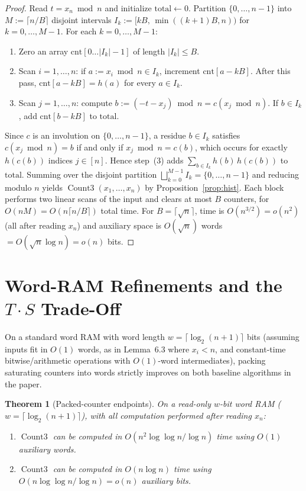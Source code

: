 \documentclass[11pt]{article}
\theoremstyle{plain}
\newtheorem{theorem}{Theorem}
\theoremstyle{definition}
\theoremstyle{remark}
\DeclareMathOperator{\CountThree}{Count3}
\begin{document}
\begin{proof}
Read $t = x_n \bmod n$ and initialize $\mathrm{total} \leftarrow 0$.
Partition $\{0, \dots, n-1\}$ into $M := \lceil n/B \rceil$ disjoint intervals $I_k := [kB,\, \min((k+1)B, n))$ for $k = 0, \dots, M-1$.
For each $k = 0, \dots, M-1$:
\begin{enumerate}[label=\textup{(\arabic*)}]
\item Zero an array $\mathrm{cnt}[0 \dots |I_k|-1]$ of length $|I_k| \le B$.
\item Scan $i = 1, \dots, n$: if $a := x_i \bmod n \in I_k$, increment $\mathrm{cnt}[a - kB]$. After this pass, $\mathrm{cnt}[a - kB] = h(a)$ for every $a \in I_k$.
\item Scan $j = 1, \dots, n$: compute $b := (-t - x_j) \bmod n = c(x_j \bmod n)$. If $b \in I_k$, add $\mathrm{cnt}[b - kB]$ to $\mathrm{total}$.
\end{enumerate}
Since $c$ is an involution on $\{0,\dots,n-1\}$, a residue $b \in I_k$ satisfies $c(x_j \bmod n) = b$ if and only if $x_j \bmod n = c(b)$, which occurs for exactly $h(c(b))$ indices $j \in [n]$. Hence step~(3) adds $\sum_{b \in I_k} h(b)\,h(c(b))$ to $\mathrm{total}$.
Summing over the disjoint partition $\bigsqcup_{k=0}^{M-1} I_k = \{0, \dots, n-1\}$ and reducing modulo $n$ yields $\CountThree(x_1, \dots, x_n)$ by Proposition~\ref{prop:hist}.
Each block performs two linear scans of the input and clears at most $B$ counters, for $O(n M) = O(n \lceil n/B \rceil)$ total time.
For $B = \lceil \sqrt{n} \rceil$, time is $O(n^{3/2}) = o(n^2)$ (all after reading $x_n$) and auxiliary space is $O(\sqrt{n})$ words $= O(\sqrt{n}\log n) = o(n)$ bits.
\end{proof}

\section{Word-RAM Refinements and the \texorpdfstring{$T \cdot S$}{T * S} Trade-Off}

On a standard word RAM with word length $w = \lceil \log_2(n+1) \rceil$ bits (assuming inputs fit in $O(1)$ words, as in Lemma~6.3 where $x_i < n$, and constant-time bitwise/arithmetic operations with $O(1)$-word intermediates), packing saturating counters into words strictly improves on both baseline algorithms in the paper.

\begin{theorem}[Packed-counter endpoints]\label{thm:packed}
On a read-only $w$-bit word RAM ($w = \lceil \log_2(n+1) \rceil$), with all computation performed after reading $x_n$:
\begin{enumerate}[label=\textup{(\arabic*)}]
\item $\CountThree$ can be computed in $O(n^2 \log\log n / \log n)$ time using $O(1)$ auxiliary words.
\item $\CountThree$ can be computed in $O(n \log n)$ time using $O(n \log\log n / \log n) = o(n)$ auxiliary bits.
\end{enumerate}
\end{theorem}
\end{document}
